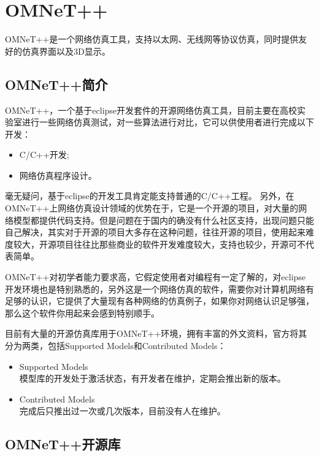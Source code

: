 \chapter{OMNeT++}

\begin{summary}
OMNeT++是一个网络仿真工具，支持以太网、无线网等协议仿真，同时提供友好的仿真界面以及3D显示。
\\
\end{summary}

\section{OMNeT++简介}

OMNeT++，一个基于eclipse开发套件的开源网络仿真工具，目前主要在高校实验室进行一些网络仿真测试，对一些算法进行对比，它可以供使用者进行完成以下开发：
\begin{itemize}
\item C/C++开发;
\item 网络仿真程序设计。
\end{itemize}

毫无疑问，基于eclipse的开发工具肯定能支持普通的C/C++工程。
另外，在OMNeT++上网络仿真设计领域的优势在于，它是一个开源的项目，对大量的网络模型都提供代码支持。但是问题在于国内的确没有什么社区支持，出现问题只能自己解决，其实对于开源的项目大多存在这种问题，往往开源的项目，使用起来难度较大，开源项目往往比那些商业的软件开发难度较大，支持也较少，开源可不代表简单。

OMNeT++对初学者能力要求高，它假定使用者对编程有一定了解的，对eclipse开发环境也是特别熟悉的，另外这是一个网络仿真的软件，需要你对计算机网络有足够的认识，它提供了大量现有各种网络的仿真例子，如果你对网络认识足够强，那么这个软件你用起来会感到特别顺手。

目前有大量的开源仿真库用于OMNeT++环境，拥有丰富的外文资料，官方将其分为两类，包括Supported Models和Contributed Models：
\begin{itemize}
	\item Supported Models \\
	模型库的开发处于激活状态，有开发者在维护，定期会推出新的版本。
	\item Contributed Models \\
	完成后只推出过一次或几次版本，目前没有人在维护。
\end{itemize}


\section{OMNeT++开源库}

